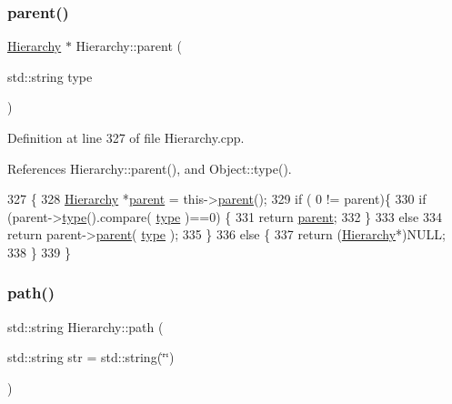 \subsubsection{\texorpdfstring{parent()}{parent()}\hspace{0.1cm}{\footnotesize\ttfamily [2/2]}}
{\footnotesize\ttfamily \hyperlink{classHierarchy}{Hierarchy} $\ast$ Hierarchy\+::parent (\begin{DoxyParamCaption}\item[{std\+::string}]{type }\end{DoxyParamCaption})\hspace{0.3cm}{\ttfamily [inherited]}}



Definition at line 327 of file Hierarchy.\+cpp.



References Hierarchy\+::parent(), and Object\+::type().


\begin{DoxyCode}
327                                             \{
328   \hyperlink{classHierarchy}{Hierarchy} *\hyperlink{classHierarchy_a1c7bec8257e717f9c1465e06ebf845fc}{parent} = this->\hyperlink{classHierarchy_a1c7bec8257e717f9c1465e06ebf845fc}{parent}();
329   \textcolor{keywordflow}{if} ( 0 != parent)\{
330     \textcolor{keywordflow}{if} (parent->\hyperlink{classObject_a84f99f70f144a83e1582d1d0f84e4e62}{type}().compare( \hyperlink{classObject_a84f99f70f144a83e1582d1d0f84e4e62}{type} )==0) \{
331       \textcolor{keywordflow}{return} \hyperlink{classHierarchy_a1c7bec8257e717f9c1465e06ebf845fc}{parent};
332     \}
333     \textcolor{keywordflow}{else}
334       \textcolor{keywordflow}{return} parent->\hyperlink{classHierarchy_a1c7bec8257e717f9c1465e06ebf845fc}{parent}( \hyperlink{classObject_a84f99f70f144a83e1582d1d0f84e4e62}{type} );
335   \}
336   \textcolor{keywordflow}{else} \{
337     \textcolor{keywordflow}{return} (\hyperlink{classHierarchy}{Hierarchy}*)NULL;
338   \}
339 \}
\end{DoxyCode}
\mbox{\label{classHierarchy_aa7990fa7caf132d83e361ce033c6c65a}} 
\subsubsection{\texorpdfstring{path()}{path()}}
{\footnotesize\ttfamily std\+::string Hierarchy\+::path (\begin{DoxyParamCaption}\item[{std\+::string}]{str = {\ttfamily std\+:\+:string(\char`\"{}\char`\"{})} }\end{DoxyParamCaption})\hspace{0.3cm}{\ttfamily [inherited]}}



